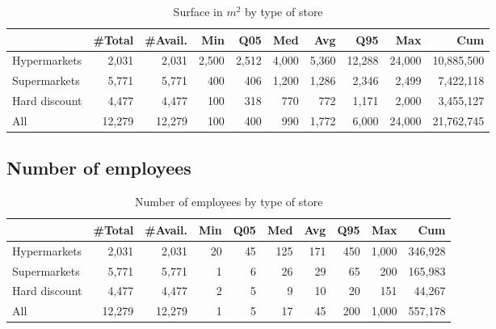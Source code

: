 \documentclass[11pt]{article}
\begin{document}
\begin{table}[H]
\caption{Surface in $m^2$ by type of store}
\small

\begin{tabular}{lrrrrrrrrr}
\toprule
{} &     \#Total &    \#Avail. &        Min &        Q05 &        Med &        Avg &        Q95 &        Max &        Cum \\
\midrule
Hypermarkets  &      2,031 &      2,031 &      2,500 &      2,512 &      4,000 &      5,360 &     12,288 &     24,000 & 10,885,500 \\
Supermarkets  &      5,771 &      5,771 &        400 &        406 &      1,200 &      1,286 &      2,346 &      2,499 &  7,422,118 \\
Hard discount &      4,477 &      4,477 &        100 &        318 &        770 &        772 &      1,171 &      2,000 &  3,455,127 \\
\midrule
All           &     12,279 &     12,279 &        100 &        400 &        990 &      1,772 &      6,000 &     24,000 & 21,762,745 \\
\bottomrule
\end{tabular}

\end{table}


\subsection{Number of employees}

\begin{table}[H]
\caption{Number of employees by type of store}
\small

\begin{tabular}{lrrrrrrrrr}
\toprule
{} &     \#Total &    \#Avail. &        Min &        Q05 &        Med &        Avg &        Q95 &        Max &        Cum \\
\midrule
Hypermarkets  &      2,031 &      2,031 &         20 &         45 &        125 &        171 &        450 &      1,000 &    346,928 \\
Supermarkets  &      5,771 &      5,771 &          1 &          6 &         26 &         29 &         65 &        200 &    165,983 \\
Hard discount &      4,477 &      4,477 &          2 &          5 &          9 &         10 &         20 &        151 &     44,267 \\
\midrule
All           &     12,279 &     12,279 &          1 &          5 &         17 &         45 &        200 &      1,000 &    557,178 \\
\bottomrule
\end{tabular}

\end{table}
\end{document}
